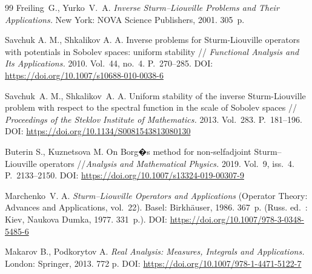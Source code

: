 \documentclass[a4paper, 12pt] {article}
\theoremstyle{plain}
\theoremstyle{remark}
\theoremstyle{plain}
\theoremstyle{definition}
\numberwithin{equation}{section}
\begin{document}
\begin{thebibliography}{99}
Freiling~G., Yurko~V.~A. {\it Inverse Sturm--Liouville Problems and Their Applications.} New York: NOVA Science Publishers, 2001.  305~p.


Savchuk A. M., Shkalikov A. A. Inverse problems for Sturm-Liouville operators with potentials in Sobolev spaces: uniform stability // {\it Functional Analysis and Its Applications.} 2010. Vol.~44, no.~4. P.~270--285. DOI: \url{ https://doi.org/10.1007/s10688-010-0038-6} 


Savchuk~A. M., Shkalikov~A. A. Uniform stability of the inverse Sturm-Liouville problem with respect to the spectral function in the scale of Sobolev spaces // {\it Proceedings of the Steklov Institute of Mathematics.} 2013. Vol.~283. P.~181--196. DOI: \url{https://doi.org/10.1134/S0081543813080130}

Buterin S., Kuznetsova M. On Borg�s method for non-selfadjoint Sturm--Liouville operators //{\it  Analysis and Mathematical Physics.} 2019. Vol.~9, iss.~4. P.~2133--2150. DOI: \url{https://doi.org/10.1007/s13324-019-00307-9}


Marchenko~V. A. {\it Sturm--Liouville Operators and  Applications} (Operator Theory: Advances and Applications, vol.~22). Basel: Birkh\"{a}user, 1986. 367~p. (Russ. ed.~: Kiev, Naukova Dumka, 1977. 331~p.).
DOI: \url{https://doi.org/10.1007/978-3-0348-5485-6}


Makarov B., Podkorytov A.
{\it Real Analysis: Measures, Integrals and Applications.} London: Springer, 2013. 772 p.
DOI: \url{https://doi.org/10.1007/978-1-4471-5122-7}


\end{thebibliography}
\end{document}
